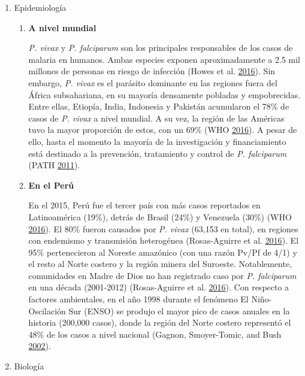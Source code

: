 \documentclass[a4paper]{article}
\begin{document}
\begin{enumerate}
\def\labelenumi{\alph{enumi}.}
\item
  Epidemiología

  \begin{enumerate}
  \def\labelenumii{\roman{enumii}.}
  \item
    \textbf{A nivel mundial}

    \emph{P. vivax} y \emph{P. falciparum} son los principales
    responsables de los casos de malaria en humanos. Ambas especies
    exponen aproximadamente a 2.5 mil millones de personas en riesgo de
    infección (Howes et al.
    \protect\hyperlink{ref-howes2016global}{2016}). Sin embargo,
    \emph{P. vivax} es el parásito dominante en las regiones fuera del
    África subsahariana, en su mayoría densamente pobladas y
    empobrecidas. Entre ellas, Etiopía, India, Indonesia y Pakistán
    acumularon el 78\% de casos de \emph{P. vivax} a nivel mundial. A su
    vez, la región de las Américas tuvo la mayor proporción de estos,
    con un 69\% (WHO \protect\hyperlink{ref-WHO2016world}{2016}). A
    pesar de ello, hasta el momento la mayoría de la investigación y
    financiamiento está destinado a la prevención, tratamiento y control
    de \emph{P. falciparum} (PATH
    \protect\hyperlink{ref-path2011}{2011}).
  \item
    \textbf{En el Perú}

    En el 2015, Perú fue el tercer país con más casos reportados en
    Latinoamérica (19\%), detrás de Brasil (24\%) y Venezuela (30\%)
    (WHO \protect\hyperlink{ref-WHO2016world}{2016}). El 80\% fueron
    causados por \emph{P. vivax} (63,153 en total), en regiones con
    endemismo y transmisión heterogénea (Rosas-Aguirre et al.
    \protect\hyperlink{ref-rosas2016peru}{2016}). El 95\% pertenecieron
    al Noreste amazónico (con una razón Pv/Pf de 4/1) y el resto al
    Norte costero y la región minera del Suroeste. Notablemente,
    comunidades en Madre de Dios no han registrado caso por \emph{P.
    falciparum} en una década (2001-2012) (Rosas-Aguirre et al.
    \protect\hyperlink{ref-rosas2016peru}{2016}). Con respecto a
    factores ambientales, en el año 1998 durante el fenómeno El
    Niño-Oscilación Sur (ENSO) se produjo el mayor pico de casos anuales
    en la historia (200,000 casos), donde la región del Norte costero
    representó el 48\% de los casos a nivel nacional (Gagnon,
    Smoyer-Tomic, and Bush
    \protect\hyperlink{ref-gagnon2002enso}{2002}). 
  \end{enumerate}
\item
  Biología


\end{enumerate}
\end{document}
